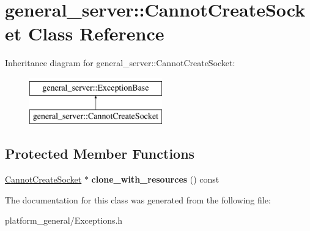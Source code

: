 \hypertarget{classgeneral__server_1_1CannotCreateSocket}{\section{general\-\_\-server\-:\-:\-Cannot\-Create\-Socket \-Class \-Reference}
\label{classgeneral__server_1_1CannotCreateSocket}
}
\-Inheritance diagram for general\-\_\-server\-:\-:\-Cannot\-Create\-Socket\-:\begin{figure}[H]
\begin{center}
\leavevmode
\includegraphics[height=2.000000cm]{classgeneral__server_1_1CannotCreateSocket}
\end{center}
\end{figure}
\subsection*{\-Protected \-Member \-Functions}
\begin{DoxyCompactItemize}
\item 
\hypertarget{classgeneral__server_1_1CannotCreateSocket_a4a0a180c281d66aba34c3f7bba461bcd}{\hyperlink{classgeneral__server_1_1CannotCreateSocket}{\-Cannot\-Create\-Socket} $\ast$ {\bfseries clone\-\_\-with\-\_\-resources} () const }\label{classgeneral__server_1_1CannotCreateSocket_a4a0a180c281d66aba34c3f7bba461bcd}

\end{DoxyCompactItemize}


\-The documentation for this class was generated from the following file\-:\begin{DoxyCompactItemize}
\item 
platform\-\_\-general/\-Exceptions.\-h\end{DoxyCompactItemize}
